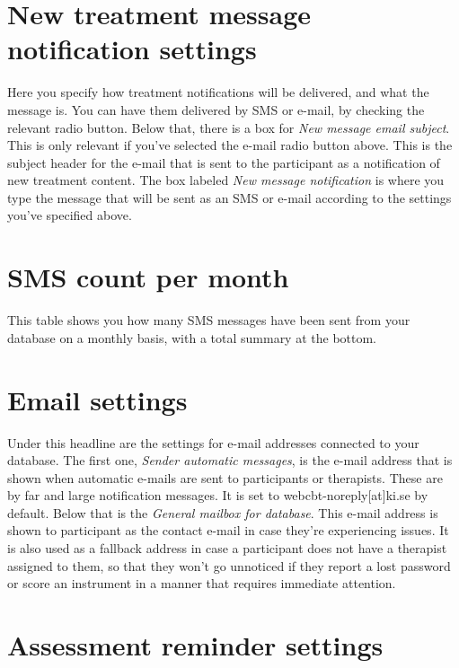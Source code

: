 \documentclass[]{book}
\begin{document}
\hypertarget{new-treatment-message-notification-settings}{%
\section{New treatment message notification settings}\label{new-treatment-message-notification-settings}}

Here you specify how treatment notifications will be delivered, and what the message is. You can have them delivered by SMS or e-mail, by checking the relevant radio button.
Below that, there is a box for \emph{New message email subject}. This is only relevant if you've selected the e-mail radio button above. This is the subject header for the e-mail that is sent to the participant as a notification of new treatment content.
The box labeled \emph{New message notification} is where you type the message that will be sent as an SMS or e-mail according to the settings you've specified above.

\hypertarget{sms-count-per-month}{%
\section{SMS count per month}\label{sms-count-per-month}}

This table shows you how many SMS messages have been sent from your database on a monthly basis, with a total summary at the bottom.

\hypertarget{email-settings}{%
\section{Email settings}\label{email-settings}}

Under this headline are the settings for e-mail addresses connected to your database. The first one, \emph{Sender automatic messages}, is the e-mail address that is shown when automatic e-mails are sent to participants or therapists. These are by far and large notification messages. It is set to webcbt-noreply{[}at{]}ki.se by default.
Below that is the \emph{General mailbox for database}. This e-mail address is shown to participant as the contact e-mail in case they're experiencing issues. It is also used as a fallback address in case a participant does not have a therapist assigned to them, so that they won't go unnoticed if they report a lost password or score an instrument in a manner that requires immediate attention.

\hypertarget{assessment-reminder-settings}{%
\section{Assessment reminder settings}\label{assessment-reminder-settings}}
\end{document}
